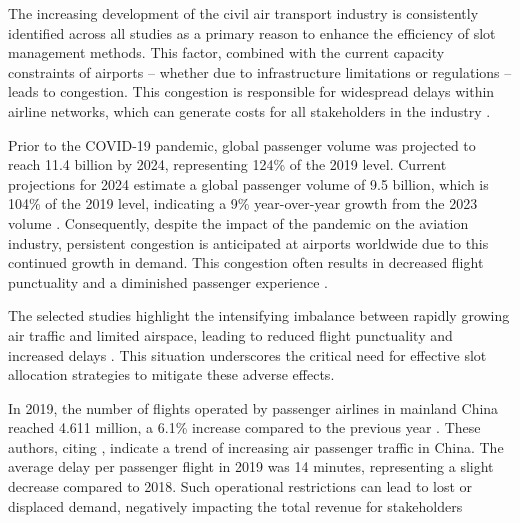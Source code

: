 The increasing development of the civil air transport industry is consistently
identified across all studies as a primary reason to enhance the efficiency of
slot management methods.
%
This factor, combined with the current capacity constraints of airports –
whether due to infrastructure limitations or regulations – leads to congestion.
%
This congestion is responsible for widespread delays within airline networks,
which can generate costs for all stakeholders in the industry
\cite{ribeiro2018optimization, dixit_algorithmic_2023}.



Prior to the COVID-19 pandemic, global passenger volume was projected to reach
11.4 billion by 2024, representing 124\% of the 2019 level.
%
Current projections for 2024 estimate a global passenger volume of 9.5 billion,
which is 104\% of the 2019 level, indicating a 9\% year-over-year growth from
the 2023 volume \cite{ACI_AirTravelDemand2025}.
%
Consequently, despite the impact of the pandemic on the aviation industry,
persistent congestion is anticipated at airports worldwide due to this continued
growth in demand.
%
This congestion often results in decreased flight punctuality and a diminished
passenger experience \cite{liu_research_2022}.



%



The selected studies highlight the intensifying imbalance between rapidly
growing air traffic and limited airspace, leading to reduced flight punctuality
and increased delays \cite{corolli_time_2014, gillen2016airport,
pellegrini_sosta_2017, jacquillat_interairline_2018, ribeiro2018optimization,
jacquillat_roadmap_2018, zografos_bi-objective_2019, lambelho_assessing_2020,
zeng_data-driven_2021, kuran_heuristic_nodate, keskin_optimal_2023,
wang_slot_2023}.
%
This situation underscores the critical need for effective slot allocation
strategies to mitigate these adverse effects.



In 2019, the number of flights operated by passenger airlines in mainland China
reached 4.611 million, a 6.1\% increase compared to the previous year
\cite{wang_distribution_2022}.
%
These authors, citing , indicate a
trend of increasing air passenger traffic in China.
%
The average delay per passenger flight in 2019 was 14 minutes, representing a
slight decrease compared to 2018.
%
Such operational restrictions can lead to lost or displaced demand, negatively
impacting the total revenue for stakeholders \cite{jacquillat_roadmap_2018}

